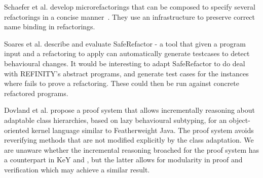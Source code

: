 Schaefer et al. develop microrefactorings that can be composed to specify several refactorings in a concise manner~\cite{Schafer-OOPSLA-2010}.
They use an infrastructure to preserve correct name binding in refactorings.

Soares et al. \cite{Soares-IEEE-2010} describe and evaluate SafeRefactor - a tool that given a program input and a refactoring to apply can automatically generate testcases to detect behavioural changes.
It would be interesting to adapt SafeRefactor to do deal with REFINITY's abstract programs, and generate test cases for the instances where \Refinity{} fails to prove a refactoring.
These could then be run against concrete refactored programs.

Dovland et al. \cite{dovland:adaptableclass2015} propose a proof system that allows
incrementally reasoning about adaptable class hierarchies, based on
lazy behavioural subtyping, for 
an object-oriented kernel language similar to Featherweight Java. The
proof system avoids reverifying methods that are not modified
explicitly by the class adaptation.
We are unaware whether the incremental reasoning broached for the proof system has a counterpart in KeY and \Refinity{}, but
the latter allows for modularity in proof and verification which may achieve a similar result.


